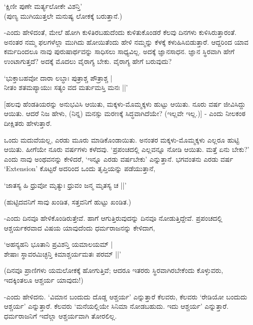 \begin{shloka}
`ಕ್ಷಿಣೀ ಪುಣೇ ಮರ್ತ್ಯಲೋಕೇ ವಿಶನ್ತಿ'\\
(ಪುಣ್ಯ ಮುಗಿಯುತ್ತಲೇ ಮನುಷ್ಯ ಲೋಕಕ್ಕೆ ಬರುತ್ತಾನೆ.)
\end{shloka}

-ಎಂದು ಹೇಳಿದಂತೆ, ಮೇಲೆ ಹೋಗಿ ಕುಳಿತಿರಬಹುದೆಂದು ಕುಳಿತುಕೊಂಡರೆ ಕೆಲವು ದಿನಗಳು ಕುಳಿಸಿರುತ್ತಾರಂತೆ. ಅನಂತರ ನಮ್ಮ ಫಲಗಳೆಲ್ಲಾ ಮುಗಿದು ಹೋಯಿತೆಂದು ಹೇಳಿ ನಮ್ಮನ್ನು ಕೆಳಕ್ಕೆ ಕಳುಹಿಸಿಬಿಡುತ್ತಾರೆ. ಆದ್ದರಿಂದ ಯಾವ ಕರ್ಮದಿಂದಲೂ ನಾವು ಪುರುಷಾರ್ಥವನ್ನು ಸಾಧಿಸಲು ಸಾಧ್ಯವಿಲ್ಲ. ಅದಕ್ಕೆ ಜ್ಞಾನಸಾಧನ. ಜ್ಞಾನ ಸ್ಥಿರವಾಗಿ ಹೇಗೆ ಉಂಟಾಗುತ್ತದೆ? ಅದಕ್ಕೆ ಮೊದಲು ವೈರಾಗ್ಯ ಬೇಕು. ವೈರಾಗ್ಯ ಹೇಗೆ ಬರುವುದು?

\begin{shloka}
`ಭುಕ್ತಾಬಹವೋ ದಾರಾ ಲಬ್ಧಾಃ ಪುತ್ರಾಶ್ಚ ಪೌತ್ರಾಶ್ಚ |\\
ನೀತಂ ಶತಮಪ್ಯಾಯುಃ ಸತ್ಯಂ ವದ ಮರ್ತುಮಸ್ತಿ ಮನಃ ||'
\end{shloka}

[ಹಲವು ಹೆಂಡತಿಯರನ್ನು ಅನುಭವಿಸಿ ಆಯಿತು, ಮಕ್ಕಳು-ಮೊಮ್ಮಕ್ಕಳು ಹುಟ್ಟು ಆಯಿತು. ನೂರು ವರ್ಷ ಜೀವಿಸಿದ್ದು ಆಯಿತು. ಆದರೆ ನಿಜ ಹೇಳು,  (ನಿನ್ನ) ಮನಸ್ಸು ಮರಣಕ್ಕೆ ಸಿದ್ಧವಾಗಿದೆಯೇ? (ಇಲ್ಲವೇ ಇಲ್ಲ.)] - ಎಂದು ನೀಲಕಂಠ ದೀಕ್ಷಿತರು ಹೇಳುತ್ತಾರೆ.

ಒಂದು ಮದುವೆಯಲ್ಲ, ಎರಡು ಮೂರು ಮಾಡಿಕೊಂಡಾಯಿತು. ಅನಂತರ ಮಕ್ಕಳು-ಮೊಮ್ಮಕ್ಕಳು ಎಲ್ಲರೂ ಹುಟ್ಟಿ ಆಯಿತು. ಹೀಗೆಯೇ ನೂರು ವರ್ಷಗಳು ಕಳೆದವು. `ಪ್ರಪಂಚದಲ್ಲಿ ಎಲ್ಲವನ್ನೂ ನೋಡಿ ಆಯಿತು. ಮತ್ತೆ ಏನು ಬೇಕು?' ಎಂದು ನಾವು ಅಂಥವನನ್ನು ಕೇಳಿದರೆ, `ಇನ್ನೂ ಎರಡು ವರ್ಷಬೇಕು' ಎನ್ನುತ್ತಾನೆ. ಭಗವಂತನು ಎರಡು ವರ್ಷ `{\eng Extension}' ಕೊಟ್ಟರೆ ಅದರಿಂದ ಒಂದು ತೃಪ್ತಿಯನ್ನು ಪಡೆಯುತ್ತಾನೆ,

\begin{shloka}
`ಜಾತಸ್ಯ ಹಿ ಧ್ರುವೋ ಮೃತ್ಯುಃ ಧ್ರುವಂ ಜನ್ಮ ಮೃತಸ್ಯ ಚ ||'
\end{shloka}

(ಹುಟ್ಟಿದವನಿಗೆ ಸಾವು ಖಂಡಿತ, ಸತ್ತವನಿಗೆ ಹುಟ್ಟು ಖಂಡಿತ.)

-ಎಂದು ದಿನವೂ ಹೇಳಿಕೊಂಡಿರುತ್ತೇವೆ. ಹಾಗೆ ಆಗುತ್ತಿರುವುದನ್ನು ದಿನವೂ ನೋಡುತ್ತಿದ್ದೇವೆ. ಪ್ರಪಂಚದಲ್ಲಿ ಆಶ್ಚರ್ಯಕರವಾದ ವಿಷಯ ಯಾವುದೆಂದು ಧರ್ಮರಾಜನನ್ನು ಕೇಳಿದಾಗ,

\begin{shloka}
`ಅಹನ್ಯಹನಿ ಭೂತಾನಿ ಪ್ರವಿಶನ್ತಿ ಯಮಾಲಯಮ್ |\\
ಶೇಷಾಃ ಸ್ಥಾವರಮಿಚ್ಛನ್ತಿ ಕಿಮಾಶ್ಚರ್ಯಮತಃ ಪರಮ್ ||'
\end{shloka}

(ದಿನವೂ ಪ್ರಾಣಿಗಳು ಯಮಲೋಕಕ್ಕೆ ಹೋಗುತ್ತಿವೆ; ಆದರೂ ಇತರರು ಸ್ಥಿರವಾಗಿರಬೇಕೆಂದು ಕೊಳ್ಳುವರು, ಇದಕ್ಕಿಂತಲೂ ಆಶ್ಚರ್ಯ ಯಾವುದು!)

-ಎಂದು ಹೇಳಿದನು. `ವಿಮಾನ ಬಂದುದು ದೊಡ್ಡ ಆಶ್ಚರ್ಯ' ಎನ್ನುತ್ತಾರೆ ಕೆಲವರು, ಕೆಲವರು `ರೇಡಿಯೋ ಬಂದುದು ಆಶ್ಚರ್ಯ' ಎನ್ನುತ್ತಾರೆ. ಕೆಲವರು `ಮನೆಯಲ್ಲಿಯೇ ಸಿನಿಮಾ ನೋಡಬಹುದು. ಇದು ಆಶ್ಚರ್ಯ' ಎನ್ನುತ್ತಾರೆ. ಧರ್ಮರಾಜನಿಗೆ ಇದೆಲ್ಲಾ ಆಶ್ಚರ್ಯವಾಗಿ ತೋರಲಿಲ್ಲ.

